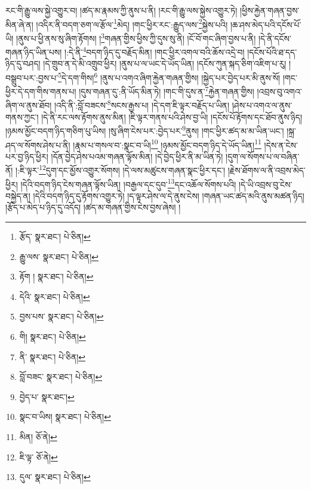 རང་གི་རྒྱུ་ལས་སྐྱེ་འགྱུར་བ། །ཚད་མ་རྣམས་ཀྱི་ནུས་པ་ནི། །རང་གི་རྒྱུ་ལས་སྐྱེས་འགྱུར་ཏེ། །ཕྱིས་རྐྱེན་གཞན་བྱས་མིན་ཞེ་ན། །འདིར་ནི་བདག་ཅག་ལ་རྩོལ་\footnote{རྩོད་  སྣར་ཐང་།  པེ་ཅིན། }མེད། །གང་ཕྱིར་རང་:རྒྱུད་ལས་\footnote{རྒྱུ་ལས་  སྣར་ཐང་།  པེ་ཅིན། }སྐྱེས་པའི། །ཆ་ཤས་མེད་པའི་དངོས་པོ་ཡི། །ནུས་པ་ཕྱི་ནས་སུ་ཞིག་རྟོགས། །\footnote{རྟོག །  སྣར་ཐང་།  པེ་ཅིན། }གཞན་གྱིས་ཕྱིས་ཀྱི་དུས་སུ་ནི། །ངོ་བོ་གང་ཞིག་བྱས་པ་ནི། །དེ་ནི་དངོས་གཞན་ཉིད་ཡིན་པས། །:དེ་ནི་\footnote{དེའི་  སྣར་ཐང་།  པེ་ཅིན། }བདག་ཉིད་དུ་བརྗོད་མིན། །གང་ཕྱིར་འགལ་བའི་ཆོས་འདྲེ་བ། །དངོས་པོའི་ཐ་དད་ཉིད་དུ་བཤད། །དེ་གྲུབ་ན་དེ་མི་འགྲུབ་ཕྱིར། །ནུས་པ་ལ་ཡང་དེ་ཡོད་ཡིན། །དངོས་ཀུན་སྐད་ཅིག་འཇིག་པ་རུ། །བསྒྲུབ་པར་:བྱས་པ་\footnote{བྱས་པས་  སྣར་ཐང་།  པེ་ཅིན། }དེ་དག་གིས།\footnote{གི།  སྣར་ཐང་།  པེ་ཅིན། } །ནུས་པ་འགའ་ཞིག་རྐྱེན་གཞན་གྱིས། །སྐྱེད་པར་བྱེད་པར་མི་ནུས་སོ། །གང་ཕྱིར་དེ་དག་གིས་གནས་པ། །དུས་གཞན་དུ་:ནི་ཡོད་མིན་ཏེ། །གང་གི་དུས་ན་\footnote{ནི་  སྣར་ཐང་།  པེ་ཅིན། }རྐྱེན་གཞན་གྱིས། །འབྲས་བུ་འགའ་ཞིག་ལ་ནུས་ཐོབ། །འདི་ནི་:བློ་བཟངས་\footnote{བློ་བཟང་  སྣར་ཐང་།  པེ་ཅིན། }སངས་རྒྱས་པ། །དེ་དག་ཇི་ལྟར་བརྗོད་པ་ཡིན། །ཤེས་པ་འགའ་ལ་ནུས་གནས་ཀྱང་། །དེ་ནི་རང་ལས་རྟོགས་ནུས་མིན། །ཇི་ལྟར་གནས་པའི་ཤེས་བྱ་ཡི། །དངོས་པོ་རྟོགས་དང་ཐོབ་ནུས་ཉིད། །ཉམས་མྱོང་བདག་ཉིད་གཅིག་པུ་ཡིས། །སུ་ཞིག་ངེས་པར་:བྱེད་པར་\footnote{བྱེད་པ་  སྣར་ཐང་། }ནུས། །གང་ཕྱིར་ཚད་མ་མ་ཡིན་ཡང་། །སྐྲ་ཤད་ལ་སོགས་ཤེས་པ་ནི། །རྣམ་པ་གསལ་བ་:སྣང་བ་ཡི།\footnote{སྣང་བ་ཡིས།  སྣར་ཐང་།  པེ་ཅིན། } །ཉམས་མྱོང་བདག་ཉིད་དེ་ཡོད་ཡིན།\footnote{མིན།  ཅོ་ནེ། } །དེས་ན་ངེས་པར་བྱ་ཉིད་ཕྱིར། །དོན་བྱེད་ཤེས་པའམ་གཞན་ལྟོས་མིན། །དེ་བྱེད་ཕྱིར་ནི་མ་ཡིན་ཏེ། །དུག་ལ་སོགས་པ་ལ་བཞིན་ནོ། །:ཇི་ལྟར་\footnote{ཇི་ལྟ་  ཅོ་ནེ། }དུག་དང་མྱོས་འགྱུར་སོགས། །དེ་ལས་མཚུངས་གཞན་སྣང་ཕྱིར་དང་། །རྗེས་ཐོགས་ལ་ནི་འབྲས་མེད་ཕྱིར། །དེའི་བདག་ཉིད་ངེས་གཞན་ལྟོས་ཡིན། །བརྒྱལ་དང་དུབ་\footnote{དུལ་  སྣར་ཐང་།  པེ་ཅིན། }དང་འཆོལ་སོགས་པའི། །དེ་ཡི་འབྲས་བུ་ངེས་བསྐྱེད་ན། །དེའི་བདག་ཉིད་དུ་རྟོགས་འགྱུར་ཏེ། །ད་ལྟར་ཤེས་ལ་དེ་ནུས་ངེས། །གཞན་ཡང་ཚད་མའི་ནུས་མཚན་ཉིད། །རྩོད་པ་མེད་པ་ཉིད་དུ་འདོད། །ཚད་མ་གཞན་གྱིས་ངེས་བྱས་ཞེས། །

